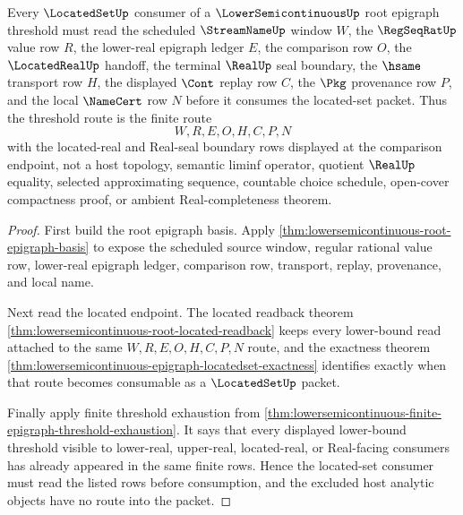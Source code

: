 
\begin{theorem}
\label{thm:lowersemicontinuous-root-locatedset-threshold-route}
Every $\LocatedSetUp$ consumer of a $\LowerSemicontinuousUp$ root epigraph threshold must read the scheduled $\StreamNameUp$ window $W$, the $\RegSeqRatUp$ value row $R$, the lower-real epigraph ledger $E$, the comparison row $O$, the $\LocatedRealUp$ handoff, the terminal $\RealUp$ seal boundary, the $\hsame$ transport row $H$, the displayed $\Cont$ replay row $C$, the $\Pkg$ provenance row $P$, and the local $\NameCert$ row $N$ before it consumes the located-set packet. Thus the threshold route is the finite route
$$
W,R,E,O,H,C,P,N
$$
with the located-real and Real-seal boundary rows displayed at the comparison endpoint, not a host topology, semantic liminf operator, quotient $\RealUp$ equality, selected approximating sequence, countable choice schedule, open-cover compactness proof, or ambient Real-completeness theorem.
\end{theorem}
\begin{proof}
First build the root epigraph basis. Apply \autoref{thm:lowersemicontinuous-root-epigraph-basis} to expose the scheduled source window, regular rational value row, lower-real epigraph ledger, comparison row, transport, replay, provenance, and local name.

Next read the located endpoint. The located readback theorem \autoref{thm:lowersemicontinuous-root-located-readback} keeps every lower-bound read attached to the same $W,R,E,O,H,C,P,N$ route, and the exactness theorem \autoref{thm:lowersemicontinuous-epigraph-locatedset-exactness} identifies exactly when that route becomes consumable as a $\LocatedSetUp$ packet.

Finally apply finite threshold exhaustion from \autoref{thm:lowersemicontinuous-finite-epigraph-threshold-exhaustion}. It says that every displayed lower-bound threshold visible to lower-real, upper-real, located-real, or Real-facing consumers has already appeared in the same finite rows. Hence the located-set consumer must read the listed rows before consumption, and the excluded host analytic objects have no route into the packet.
\end{proof}

